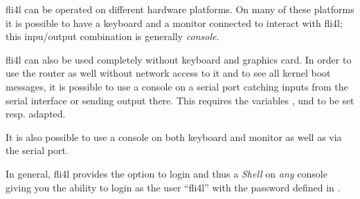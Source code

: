 

fli4l can be operated on different hardware platforms. On many of these
platforms it is possible to have a keyboard and a monitor connected to 
interact with fli4l; this inpu/output combination is generally \emph{console}.

fli4l can also be used completely without keyboard and graphics card. 
In order to use the router as well without network access to it and 
to see all kernel boot messages, it is possible to use a console on a 
serial port catching inputs from the serial interface or sending output there. 
This requires the variables
,
 und
 to be set resp. adapted.

It is also possible to use a console on both keyboard and monitor as well as 
via the serial port.

In general, fli4l provides the option to login and thus a \emph{Shell} on
\emph{any} console giving you the ability to login as the user ``fli4l'' 
with the password defined in .

